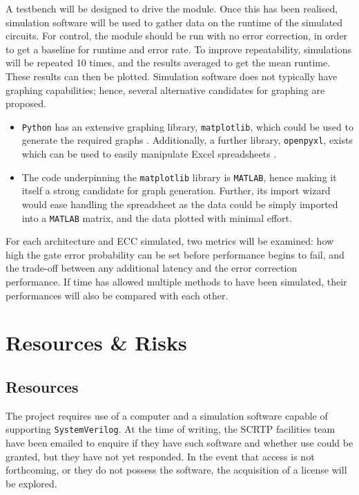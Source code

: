 \documentclass[12pt,a4paper]{article}
\begin{document}
\noindent A testbench will be designed to drive the module. Once this has been realised, simulation software will be 
used to gather data on the runtime of the simulated circuits. For control, the module should be run with no error 
correction, in order to get a baseline for runtime and error rate. To improve repeatability, simulations will be 
repeated 10 times, and the results averaged to get the mean runtime. These results can then be plotted. Simulation 
software does not typically have graphing capabilities; hence, several alternative candidates for graphing are 
proposed.
\begin{itemize}
    \item \texttt{Python} has an extensive graphing library, \texttt{matplotlib}, which could be used to generate 
    the required graphs \cite{ref3}. Additionally, a further library, \texttt{openpyxl}, exists which can be used to 
    easily manipulate Excel spreadsheets \cite{ref4}.
    \item The code underpinning the \texttt{matplotlib} library is \texttt{MATLAB}, hence making it itself a strong 
    candidate for graph generation. Further, its import wizard would ease handling the spreadsheet as the data could 
    be simply imported into a \texttt{MATLAB} matrix, and the data plotted with minimal effort.
\end{itemize}

\noindent For each architecture and ECC simulated, two metrics will be examined: how high the gate error probability 
can be set before performance begins to fail, and the trade-off between any additional latency and the error 
correction performance. If time has allowed multiple methods to have been simulated, their performances will also be 
compared with each other.


\section{Resources \& Risks}
\subsection{Resources}
The project requires use of a computer and a simulation software capable of supporting \texttt{SystemVerilog}. At 
the time of writing, the SCRTP facilities team have been emailed to enquire if they have such software and whether 
use could be granted, but they have not yet responded. In the event that access is not forthcoming, or they do 
not possess the software, the acquisition of a license will be explored.
\end{document}
